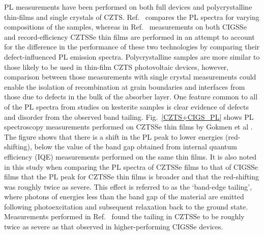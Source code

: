 \documentclass[11pt, twoside]{report}
\begin{document}
PL measurements have been performed on both full devices and polycrystalline thin-films \cite{band_tail, Gershon, Gershon_ref18, Romero, Miyamoto, Unold} and single crystals \cite{Halliday, Levcenko, Hones} of CZTS. Ref.~ compares the PL spectra for varying compositions of the samples, whereas in Ref.~ measurements on both CIGSSe and record-efficiency CZTSSe thin films are performed in an attempt to account for the difference in the performance of these two technologies by comparing their defect-influenced PL emission spectra. Polycrystalline samples are more similar to those likely to be used in thin-film CZTS photovoltaic devices, however, comparison between those measurements with single crystal measurements could enable the isolation of recombination at grain boundaries and interfaces from those due to defects in the bulk of the absorber layer. 
One feature common to all of the PL spectra from studies on kesterite samples is clear evidence of defects and disorder from the observed band tailing. 
Fig.~\ref{CZTS+CIGS_PL} shows PL spectroscopy measurements performed on CZTSSe thin films by Gokmen et al \cite{band_tail}. The figure shows that there is a shift in the PL peak to lower energies (red-shifting), below the value of the band gap obtained from internal quantum efficiency (IQE) measurements performed on the same thin films. It is also noted in this study when comparing the PL spectra of CZTSSe films to that of CIGSSe films that the PL peak for CZTSSe thin films is broader and that the red-shifting was roughly twice as severe. This effect is referred to as the `band-edge tailing', where photons of energies less than the band gap of the material are emitted following photoexcitation and subsequent relaxation back to the ground state. 
Measurements performed in Ref.~ found the tailing in CZTSSe to be roughly twice as severe as that observed in higher-performing CIGSSe devices.
\end{document}
